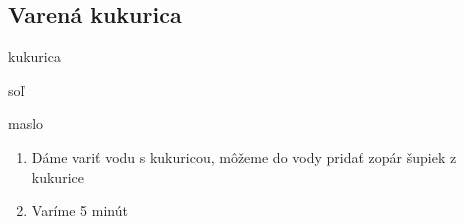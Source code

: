 \setcounter{step}{0}
\subsection{Varená kukurica}

\begin{ingredient}
\def\portions{4}%

\begin{main}
	\item kukurica
	\item soľ
	\item maslo
\end{main}
\end{ingredient}
\begin{recipe}

\begin{enumerate}

\item{Dáme variť vodu s kukuricou, môžeme do vody pridať zopár šupiek z kukurice}
\item{Varíme 5 minút}

\end{enumerate}
\end{recipe}

\begin{notes}

\end{notes}
\clearpage	
